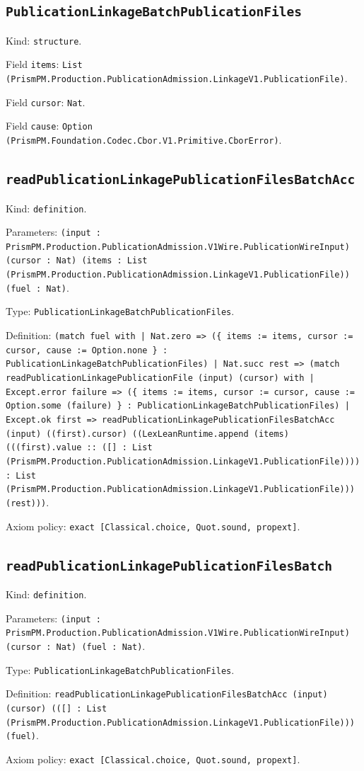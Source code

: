 \documentclass[11pt]{article}
\begin{document}
\subsection*{\texttt{PublicationLinkageBatchPublicationFiles}}
\noindent Kind: \texttt{structure}.\par
\noindent Field \texttt{items}: \texttt{List (PrismPM.Production.PublicationAdmission.LinkageV1.PublicationFile)}.\par
\noindent Field \texttt{cursor}: \texttt{Nat}.\par
\noindent Field \texttt{cause}: \texttt{Option (PrismPM.Foundation.Codec.Cbor.V1.Primitive.CborError)}.\par
\subsection*{\texttt{readPublicationLinkagePublicationFilesBatchAcc}}
\noindent Kind: \texttt{definition}.\par
\noindent Parameters: \texttt{(input : PrismPM.Production.PublicationAdmission.V1Wire.PublicationWireInput) (cursor : Nat) (items : List (PrismPM.Production.PublicationAdmission.LinkageV1.PublicationFile)) (fuel : Nat)}.\par
\noindent Type: \texttt{PublicationLinkageBatchPublicationFiles}.\par
\noindent Definition: \texttt{(match fuel with | Nat.zero => (\{ items := items, cursor := cursor, cause := Option.none \} : PublicationLinkageBatchPublicationFiles) | Nat.succ rest => (match readPublicationLinkagePublicationFile (input) (cursor) with | Except.error failure => (\{ items := items, cursor := cursor, cause := Option.some (failure) \} : PublicationLinkageBatchPublicationFiles) | Except.ok first => readPublicationLinkagePublicationFilesBatchAcc (input) ((first).cursor) ((LexLeanRuntime.append (items) (((first).value :: ([] : List (PrismPM.Production.PublicationAdmission.LinkageV1.PublicationFile)))) : List (PrismPM.Production.PublicationAdmission.LinkageV1.PublicationFile))) (rest)))}.\par
\noindent Axiom policy: \texttt{exact [Classical.choice, Quot.sound, propext]}.\par
\subsection*{\texttt{readPublicationLinkagePublicationFilesBatch}}
\noindent Kind: \texttt{definition}.\par
\noindent Parameters: \texttt{(input : PrismPM.Production.PublicationAdmission.V1Wire.PublicationWireInput) (cursor : Nat) (fuel : Nat)}.\par
\noindent Type: \texttt{PublicationLinkageBatchPublicationFiles}.\par
\noindent Definition: \texttt{readPublicationLinkagePublicationFilesBatchAcc (input) (cursor) (([] : List (PrismPM.Production.PublicationAdmission.LinkageV1.PublicationFile))) (fuel)}.\par
\noindent Axiom policy: \texttt{exact [Classical.choice, Quot.sound, propext]}.\par
\end{document}

